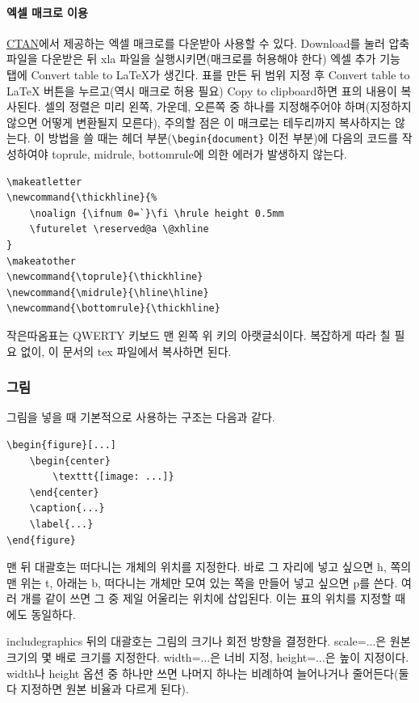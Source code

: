 \documentclass[11pt]{article}
\begin{document}
\paragraph{엑셀 매크로 이용}
\href{https://www.ctan.org/pkg/excel2latex}{CTAN}에서 제공하는 엑셀 매크로를 
다운받아 사용할 수 있다. Download를 눌러 압축 파일을 다운받은 뒤 xla 파일을 
실행시키면(매크로를 허용해야 한다) 엑셀 추가 기능 탭에 Convert table to LaTeX가 
생긴다. 표를 만든 뒤 범위 지정 후 Convert table to LaTeX 버튼을 누르고(역시 
매크로 허용 필요) Copy to clipboard하면 표의 내용이 복사된다. 셀의 정렬은 미리 
왼쪽, 가운데, 오른쪽 중 하나를 지정해주어야 하며(지정하지 않으면 어떻게 
변환될지 모른다), 주의할 점은 이 매크로는 테두리까지 복사하지는 않는다.
이 방법을 쓸 때는 헤더 부분(\verb|\begin{document}| 이전 부분)에 다음의 코드를 
작성하여야 toprule, midrule, bottomrule에 의한 에러가 발생하지 않는다.
\begin{verbatim}
\makeatletter
\newcommand{\thickhline}{%
	\noalign {\ifnum 0=`}\fi \hrule height 0.5mm
	\futurelet \reserved@a \@xhline
}
\makeatother
\newcommand{\toprule}{\thickhline}
\newcommand{\midrule}{\hline\hline}
\newcommand{\bottomrule}{\thickhline}
\end{verbatim}
작은따옴표는 QWERTY 키보드 맨 왼쪽 위 키의 아랫글쇠이다. 복잡하게 따라 칠 필요 
없이, 이 문서의 tex 파일에서 복사하면 된다.

\subsubsection{그림} \label{figuresec}
그림을 넣을 때 기본적으로 사용하는 구조는 다음과 같다.
\begin{verbatim}
\begin{figure}[...]
	\begin{center}
		\texttt{[image: ...]}
	\end{center}
	\caption{...}
	\label{...}
\end{figure}
\end{verbatim}

맨 뒤 대괄호는 떠다니는 개체의 위치를 지정한다. 바로 그 자리에 넣고 싶으면 h, 
쪽의 맨 위는 t, 아래는 b, 떠다니는 개체만 모여 있는 쪽을 만들어 넣고 싶으면 p를 
쓴다. 여러 개를 같이 쓰면 그 중 제일 어울리는 위치에 삽입된다. 이는 표의 위치를 
지정할 때에도 동일하다.

includegraphics 뒤의 대괄호는 그림의 크기나 회전 방향을 결정한다. scale=...은 
원본 크기의 몇 배로 크기를 지정한다. width=...은 너비 지정, height=...은 높이 
지정이다. width나 height 옵션 중 하나만 쓰면 나머지 하나는 비례하여 늘어나거나 
줄어든다(둘 다 지정하면 원본 비율과 다르게 된다).
\end{document}
